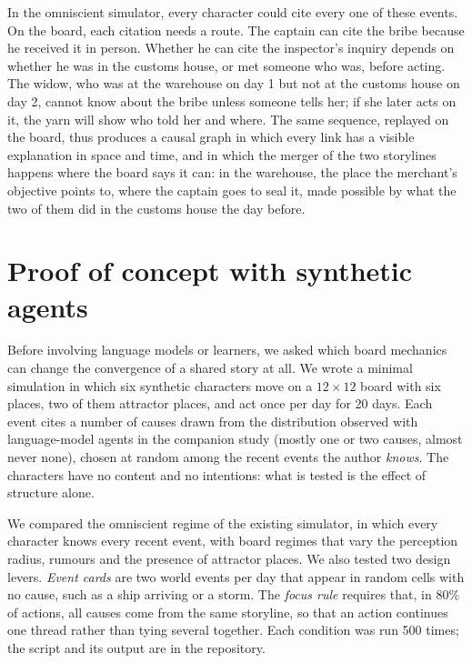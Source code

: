 \documentclass[12pt]{article}
\begin{document}
In the omniscient simulator, every character could cite every one of these
events. On the board, each citation needs a route. The captain can cite the
bribe because he received it in person. Whether he can cite the inspector's
inquiry depends on whether he was in the customs house, or met someone who
was, before acting. The widow, who was at the warehouse on day 1 but not at
the customs house on day 2, cannot know about the bribe unless someone tells
her; if she later acts on it, the yarn will show who told her and where.
The same sequence, replayed on the board, thus produces a causal graph in
which every link has a visible explanation in space and time, and in which
the merger of the two storylines happens where the board says it can: in
the warehouse, the place the merchant's objective points to, where the
captain goes to seal it, made possible by what the two of them did in the
customs house the day before.

\section{Proof of concept with synthetic agents}

Before involving language models or learners, we asked which board mechanics
can change the convergence of a shared story at all. We wrote a minimal
simulation in which six synthetic characters move on a $12 \times 12$ board
with six places, two of them attractor places, and act once per day for 20
days. Each event cites a number of causes drawn from the distribution
observed with language-model agents in the companion study (mostly one or
two causes, almost never none), chosen at random among the recent events
the author \emph{knows}. The characters have no content and no intentions:
what is tested is the effect of structure alone.

We compared the omniscient regime of the existing simulator, in which every
character knows every recent event, with board regimes that vary the
perception radius, rumours and the presence of attractor places. We also
tested two design levers. \emph{Event cards} are two world events per day
that appear in random cells with no cause, such as a ship arriving or a
storm. The \emph{focus rule} requires that, in 80\% of actions, all causes
come from the same storyline, so that an action continues one thread rather
than tying several together. Each condition was run 500 times; the script
and its output are in the repository.
\end{document}

